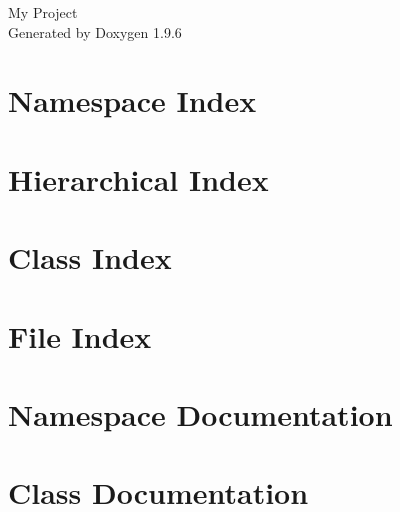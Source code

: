 \documentclass[twoside]{book}
\newcommand{\+}{\discretionary{\mbox{\scriptsize$\hookleftarrow$}}{}{}}
\newcommand{\clearemptydoublepage}{%
    \newpage{\pagestyle{empty}\cleardoublepage}%
  }
\begin{document}
  \raggedbottom
  \begin{titlepage}
  \vspace*{7cm}
  \begin{center}%
  {\Large My Project}\\
  \vspace*{1cm}
  {\large Generated by Doxygen 1.9.6}\\
  \end{center}
  \end{titlepage}
  \clearemptydoublepage
  \tableofcontents
  \clearemptydoublepage
\chapter{Namespace Index}

\chapter{Hierarchical Index}

\chapter{Class Index}

\chapter{File Index}

\chapter{Namespace Documentation}









\chapter{Class Documentation}
































\end{document}
